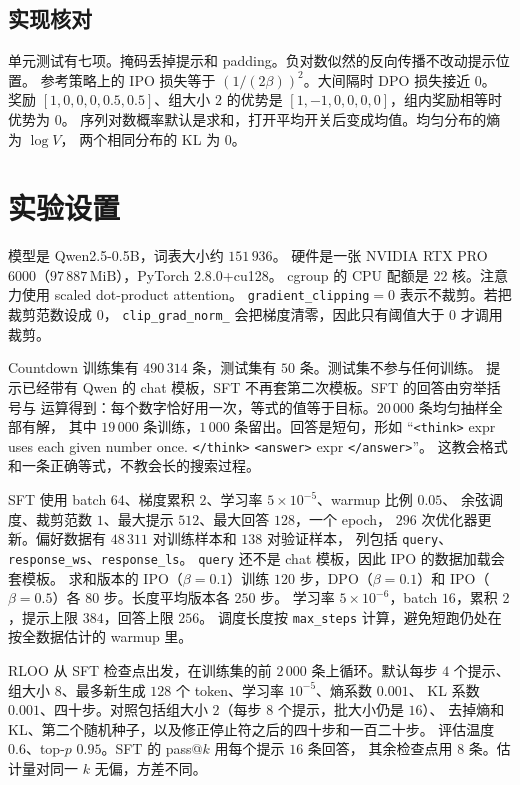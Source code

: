 \documentclass[10pt,twocolumn,a4paper]{ctexart}
\begin{document}
\subsection{实现核对}
单元测试有七项。掩码丢掉提示和 padding。负对数似然的反向传播不改动提示位置。
参考策略上的 IPO 损失等于 $(1/(2\beta))^2$。大间隔时 DPO 损失接近 $0$。
奖励 $[1,0,0,0,0.5,0.5]$、组大小 $2$ 的优势是 $[1,-1,0,0,0,0]$，组内奖励相等时优势为 $0$。
序列对数概率默认是求和，打开平均开关后变成均值。均匀分布的熵为 $\log V$，
两个相同分布的 KL 为 $0$。

\section{实验设置}
模型是 Qwen2.5-0.5B，词表大小约 $151\,936$\citep{qwen2025qwen25}。
硬件是一张 NVIDIA RTX PRO 6000（$97\,887\,\mathrm{MiB}$），PyTorch $2.8.0$+cu128。
cgroup 的 CPU 配额是 $22$ 核。注意力使用 scaled dot-product attention。
\texttt{gradient\_clipping}$=0$ 表示不裁剪。若把裁剪范数设成 $0$，
\texttt{clip\_grad\_norm\_} 会把梯度清零，因此只有阈值大于 $0$ 才调用裁剪。

Countdown 训练集有 $490\,314$ 条，测试集有 $50$ 条。测试集不参与任何训练。
提示已经带有 Qwen 的 chat 模板，SFT 不再套第二次模板。SFT 的回答由穷举括号与
运算得到：每个数字恰好用一次，等式的值等于目标。$20\,000$ 条均匀抽样全部有解，
其中 $19\,000$ 条训练，$1\,000$ 条留出。回答是短句，形如
``\texttt{<think>} expr uses each given number once. \texttt{</think>}
\texttt{<answer>} expr \texttt{</answer>}''。
这教会格式和一条正确等式，不教会长的搜索过程。

SFT 使用 batch $64$、梯度累积 $2$、学习率 $5\times 10^{-5}$、warmup 比例 $0.05$、
余弦调度、裁剪范数 $1$、最大提示 $512$、最大回答 $128$，一个 epoch，
$296$ 次优化器更新。偏好数据有 $48\,311$ 对训练样本和 $138$ 对验证样本，
列包括 \texttt{query}、\texttt{response\_ws}、\texttt{response\_ls}。
\texttt{query} 还不是 chat 模板，因此 IPO 的数据加载会套模板。
求和版本的 IPO（$\beta=0.1$）训练 $120$ 步，DPO（$\beta=0.1$）和
IPO（$\beta=0.5$）各 $80$ 步。长度平均版本各 $250$ 步。
学习率 $5\times 10^{-6}$，batch $16$，累积 $2$，提示上限 $384$，回答上限 $256$。
调度长度按 \texttt{max\_steps} 计算，避免短跑仍处在按全数据估计的 warmup 里。

RLOO 从 SFT 检查点出发，在训练集的前 $2\,000$ 条上循环。默认每步 $4$ 个提示、
组大小 $8$、最多新生成 $128$ 个 token、学习率 $10^{-5}$、熵系数 $0.001$、
KL 系数 $0.001$、四十步。对照包括组大小 $2$（每步 $8$ 个提示，批大小仍是 $16$）、
去掉熵和 KL、第二个随机种子，以及修正停止符之后的四十步和一百二十步。
评估温度 $0.6$、top-$p$ $0.95$。SFT 的 pass@$k$ 用每个提示 $16$ 条回答，
其余检查点用 $8$ 条。估计量对同一 $k$ 无偏，方差不同。
\end{document}
